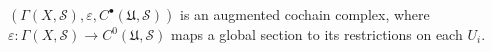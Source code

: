 $(\Gamma(X, \mathcal{S}), \varepsilon, C^\bullet(\mathfrak{U}, \mathcal{S}))$ is an augmented cochain complex, where $\varepsilon: \Gamma(X, \mathcal{S}) \to C^0(\mathfrak{U}, \mathcal{S})$ maps a global section to its restrictions on each $U_i$.
